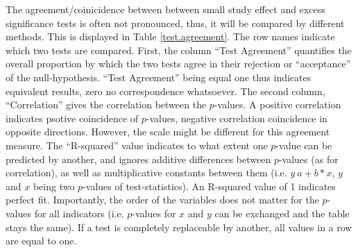 \documentclass[11pt,a4paper,twoside]{book}\usepackage[]{graphicx}\usepackage[]{color}
\begin{document}
The agreement/coinicidence between between small study effect and excess significance tests is often not pronounced, thus, it will be compared by different methods. This is displayed in Table \ref{test.agreement}. The row names indicate which two tests are compared. First, the column ``Test Agreement'' quantifies the overall proportion by which the two tests agree in their rejection or ``acceptance'' of the null-hypothesis. ``Test Agreement'' being equal one thus indicates equivalent results, zero no correspondence whatsoever. The second column, ``Correlation'' gives the correlation between the $p$-values. A positive correlation indicates psotive coincidence of $p$-values, negative correlation coincidence in opposite directions. However, the scale might be different for this agreement measure. The ``R-squared'' value indicates to what extent one $p$-value can be predicted by another, and ignores additive differences between $p$-values (as for correlation), as well as multiplicative constants between them (i.e. $y ~ a + b*x$, $y$ and $x$ being two $p$-values of test-statistics). An R-squared value of 1 indicates perfect fit. Importantly, the order of the variables does not matter for the $p$-values for all indicators (i.e. $p$-values for $x$ and $y$ can be exchanged and the table stays the same). If a test is completely replaceable by another, all values in a row are equal to one. 
\end{document}
